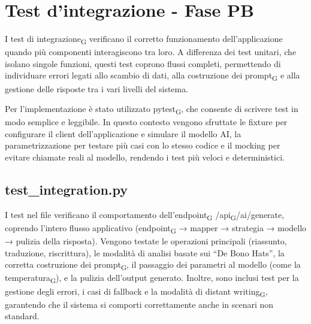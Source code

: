 \documentclass[11pt,a4paper]{article}
\newcommand{\gls}[1]{#1\textsubscript{G}}
\begin{document}
\newpage

\section{Test d'integrazione - Fase PB}
I \gls{test di integrazione} verificano il corretto funzionamento dell’applicazione quando più componenti interagiscono tra loro. A differenza dei test unitari, che isolano singole funzioni, questi test coprono flussi completi, permettendo di individuare errori legati allo scambio di dati, alla costruzione dei \gls{prompt} e alla gestione delle risposte tra i vari livelli del sistema.

Per l’implementazione è stato utilizzato \gls{pytest}, che consente di scrivere test in modo semplice e leggibile. In questo contesto vengono sfruttate le fixture per configurare il client dell’applicazione e simulare il modello AI, la parametrizzazione per testare più casi con lo stesso codice e il mocking per evitare chiamate reali al modello, rendendo i test più veloci e deterministici.

\subsection{test\_integration.py}
I test nel file verificano il comportamento dell’\gls{endpoint} /\gls{api}/ai/generate, coprendo l’intero flusso applicativo (\gls{endpoint} → mapper → strategia → modello → pulizia della risposta). Vengono testate le operazioni principali (riassunto, traduzione, riscrittura), le modalità di analisi basate sui “De Bono Hats”, la corretta costruzione dei \gls{prompt}, il passaggio dei parametri al modello (come la \gls{temperatura}), e la pulizia dell’output generato. Inoltre, sono inclusi test per la gestione degli errori, i casi di fallback e la modalità di \gls{distant writing}, garantendo che il sistema si comporti correttamente anche in scenari non standard.
\end{document}
